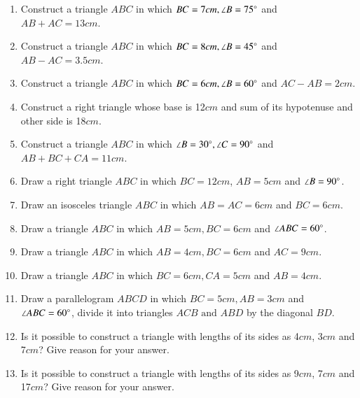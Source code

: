 \begin{enumerate}[label=\thesubsection.\arabic*,ref=\thesubsection.\theenumi]
\item Construct a triangle $ABC$ in which $BC=7cm, \angle{B}=75\degree$ and $AB + AC = 13 cm$.
\label{chapters/9/11/2/1}
	\\
	\solution 

%
\item Construct a triangle $ABC$ in which $BC=8cm, \angle{B}=45\degree$ and $AB - AC = 3.5 cm$.
\label{chapters/9/11/2/2}
\\
\solution

%
\item Construct a triangle $ABC$ in which $BC=6cm, \angle{B}=60\degree$ and $AC - AB = 2cm$.
\label{chapters/9/11/2/3}
\\
\solution 

%
\item Construct a right triangle whose base is 12$cm$ and sum of its hypotenuse and other side is 18$cm$.
\label{chapters/9/11/2/5}
\\
\solution

%
\item Construct a triangle $ABC$ in which $\angle{B}=30\degree, \angle{C}=90\degree$ and  $AB+BC+CA=11cm$.
\label{chapters/9/11/2/4}
\\
\solution 

%
\item Draw a right triangle ${ABC}$ in which $BC=12 cm$, $AB=5 cm$ and $\angle{B}=90\degree$.
\item Draw an isosceles triangle ${ABC}$ in which $AB=AC=6cm$ and $BC =6cm$.
\item Draw a triangle ${ABC}$ in which $AB=5cm,BC=6cm$ and $\angle {ABC}=60\degree$.
\item Draw a triangle ${ABC}$ in which $AB=4cm, BC=6cm$ and $AC=9cm$.
\item Draw a triangle ${ABC}$ in which $BC=6 cm, CA=5 cm$ and $AB=4 cm$. 
\item Draw a parallelogram ${ABCD}$ in which $BC=5 cm, AB=3 cm$ and $\angle{ABC}=60\degree$, divide it into triangles ${ACB}\text{ and }{ABD}$ by the diagonal $BD$. 
\item Is it possible to construct a triangle with lengths of its sides as 4$cm$, 3$cm$ and 7$cm$? Give reason for your answer.

\item Is it possible to construct a triangle with lengths of its sides as 9$cm$, 7$cm$ and 17$cm$? Give reason for your answer.


\end{enumerate}
